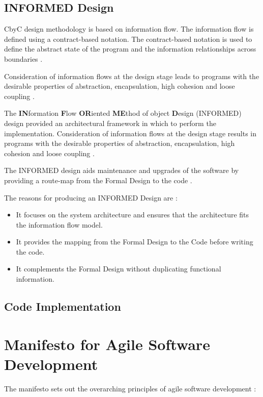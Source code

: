 \subsection{INFORMED Design}
CbyC design methodology is based on information flow. The information flow is 
defined using a contract-based notation. The contract-based notation is used to
define the abstract state of the program and the information relationships across
boundaries \parencite{CbyCMan}.

Consideration of information flows at the design stage leads to programs with the
desirable properties of abstraction, encapsulation, high cohesion and loose 
coupling \parencite{Tokeneer}.

The \textbf{IN}formation \textbf{F}low \textbf{OR}iented \textbf{ME}thod of
object \textbf{D}esign (INFORMED) design provided an architectural framework
in which to perform the implementation. Consideration of information flows at the
design stage results in programs with the desirable properties of abstraction, 
encapsulation, high cohesion and loose coupling \parencite{Tokeneer}.

The INFORMED design aids maintenance and upgrades of the software by providing a
route-map from the Formal Design to the code \parencite{Tokeneer}.

The reasons for producing an INFORMED Design are \parencite{Tokeneer}:
\begin{itemize}
	\item It focuses on the system architecture and ensures that the architecture 
		fits the information flow model.
	\item It provides the mapping from the Formal Design to the Code before writing
		the code.
	\item It complements the Formal Design without duplicating functional information.
\end{itemize}

\subsection{Code Implementation}


\section{Manifesto for Agile Software Development}

The manifesto sets out the overarching principles of agile software development \parencite{Beck2001ManifestoFA}:

